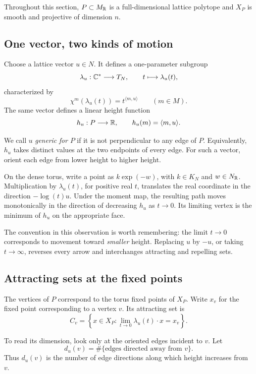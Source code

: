 Throughout this section, \(P\subset M_{\mathbb{R}}\) is a full-dimensional
lattice polytope and \(X_P\) is smooth and projective of dimension \(n\).

\subsection{One vector, two kinds of motion}

Choose a lattice vector \(u\in N\). It defines a one-parameter subgroup
\[
\lambda_u:\mathbb{C}^*\longrightarrow T_N,
\qquad
t\longmapsto\lambda_u(t),
\]
characterized by
\[
\chi^m(\lambda_u(t))=t^{\langle m,u\rangle}
\qquad(m\in M).
\]
The same vector defines a linear height function
\[
h_u:P\longrightarrow\mathbb{R},
\qquad
h_u(m)=\langle m,u\rangle.
\]

We call \(u\) \emph{generic for \(P\)} if it is not perpendicular to
any edge of \(P\). Equivalently, \(h_u\) takes distinct values at the
two endpoints of every edge. For such a vector, orient each edge from
lower height to higher height.

\begin{observation}
On the dense torus, write a point as \(k\exp(-w)\), with
\(k\in K_N\) and \(w\in N_{\mathbb{R}}\). Multiplication by
\(\lambda_u(t)\), for positive real \(t\), translates the real
coordinate in the direction \(-\log(t)u\). Under the moment map, the
resulting path moves monotonically in the direction of decreasing
\(h_u\) as \(t\to0\). Its limiting vertex is the minimum of \(h_u\)
on the appropriate face.
\end{observation}

The convention in this observation is worth remembering: the limit
\(t\to0\) corresponds to movement toward \emph{smaller} height. Replacing
\(u\) by \(-u\), or taking \(t\to\infty\), reverses every arrow and
interchanges attracting and repelling sets.

\subsection{Attracting sets at the fixed points}

The vertices of \(P\) correspond to the torus fixed points of \(X_P\).
Write \(x_v\) for the fixed point corresponding to a vertex \(v\). Its
attracting set is
\[
C_v
=
\left\{
x\in X_P:
\lim_{t\to0}\lambda_u(t)\cdot x=x_v
\right\}.
\]

To read its dimension, look only at the oriented edges incident to
\(v\). Let
\[
d_u(v)
=
\#\{\text{edges directed away from }v\}.
\]
Thus \(d_u(v)\) is the number of edge directions along which height
increases from \(v\).

